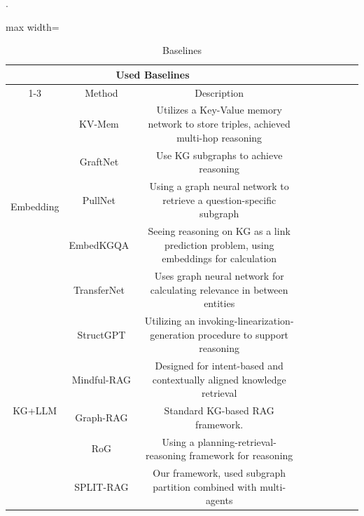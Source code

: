 \documentclass[sigconf]{acmart}
\begin{document}
\begin{table}[h]
\centering
\caption{Baselines}.
\begin{adjustbox}{max width=\textwidth} 
\begin{tabular}{cc|cc|ccccc}
    \toprule
    \multicolumn{3}{c}{\textbf{Used Baselines}} \\ \cline{1-3}
    \multirow{1}{*}{Type} & \multirow{1}{*}{Method} & \multirow{1}{*}{Description}\\ 
    \midrule
    \multirow{5}{*}{Embedding}  & KV-Mem~\cite{miller2016key}                
                                & Utilizes a Key-Value memory network to store triples, achieved multi-hop reasoning  \\ 
                                & GraftNet~\cite{sun2018open}                
                                & Use KG subgraphs to achieve reasoning  \\ 
                                & PullNet~\cite{sun2019pullnet}                 
                                & Using a graph neural network to retrieve a question-specific subgraph  \\
                                & EmbedKGQA~\cite{saxena2020improving}                
                                & Seeing reasoning on KG as a link prediction problem, using embeddings for calculation   \\ 
                                & TransferNet~\cite{shi2021transfernet}                 
                                & Uses graph neural network for calculating relevance in between entities  \\ %
                           
    \midrule
    \multirow{5}{*}{KG+LLM}     
                                & StructGPT \cite{jiang2023structgpt}                
                                & Utilizing an invoking-linearization-generation procedure to support reasoning \\
                                & Mindful-RAG \cite{agrawal2024mindful}
                                & Designed for intent-based and contextually aligned knowledge retrieval  \\
                                & Graph-RAG                 
                                & Standard KG-based RAG framework. \\
                                & RoG \cite{luo2023reasoning}
                                & Using a planning-retrieval-reasoning framework for reasoning  \\
                                & SPLIT-RAG                 
                                & Our framework, used subgraph partition combined with multi-agents \\
    \midrule
    

\end{tabular}
\end{adjustbox}
\end{table}
\end{document}
